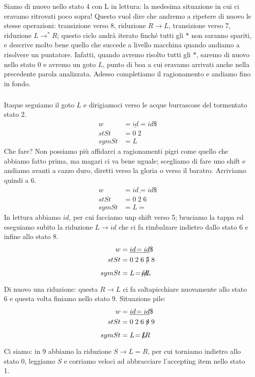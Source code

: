 \documentclass[class=book, crop=false, oneside, 12pt]{standalone}
\begin{document}
Siamo di nuovo nello stato 4 con L in lettura: la medesima situazione in cui ci eravamo ritrovati poco sopra! Questo vuol dire che andremo a ripetere di nuovo le stesse operazioni: transizione verso 8, riduzione \(R \to L\), transizione verso 7, riduzione \(L \to ^{*}R\); questo ciclo andrà iterato finché tutti gli \(\ast\) non saranno spariti, e descrive molto bene quello che succede a livello macchina quando andiamo a risolvere un puntatore. Infatti, quando avremo risolto tutti gli \(\ast\), saremo di nuovo nello stato 0 e avremo un goto \(L\), punto di boa a cui eravamo arrivati anche nella precedente parola analizzata. Adesso completiamo il ragionamento e andiamo fino in fondo.
\subparagraph*{}
Itaque seguiamo il goto \(L\) e dirigiamoci verso le acque burrascose del tormentato stato 2. 
\begin{align*}
    w &= \underline{id}\!=id\$ \\
    stSt &= 0\;2\\
    symSt &= L 
\end{align*}
Che fare? Non possiamo più affidarci a ragionamenti pigri come quello che abbiamo fatto prima, ma magari ci va bene uguale; scegliamo di fare uno shift e andiamo avanti a cazzo duro, diretti verso la gloria o verso il baratro. Arriviamo quindi a 6.
\begin{align*}
    w &= \underline{id\!=}id\$ \\
    stSt &= 0\;2\;6 \\
    symSt &= L\!=
\end{align*}
In lettura abbiamo \(id\), per cui facciamo unp shift verso 5; bruciamo la tappa ed eseguiamo subito la riduzione \(L \to id\) che ci fa rimbalzare indietro dallo stato 6 e infine allo stato 8.
\begin{align*}
    w &= \underline{id\!=id}\$ \\
    stSt &= 0\;2\;6\;\xout{5}\;8 \\
    symSt &= L\!=\!\xout{id}\!L
\end{align*}
Di nuovo una riduzione: questa \(R \to L\) ci fa saltapicchiare nuovamente allo stato 6 e questa volta finiamo nello stato 9. Situazione pile:
\begin{align*}
    w &= \underline{id\!=id}\$ \\
    stSt &= 0\;2\;6\;\xout{8}\;9 \\
    symSt &= L\!=\!\xout{L}\!R
\end{align*}
Ci siamo: in 9 abbiamo la riduzione \(S \to L = R\), per cui torniamo indietro allo stato 0, leggiamo \(S\) e corriamo veloci ad abbracciare l'accepting item nello stato 1.
\end{document}
